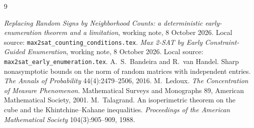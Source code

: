 \documentclass[11pt,a4paper]{article}
\theoremstyle{remark}
\begin{document}
\begin{thebibliography}{9}
\small\raggedright
{} \emph{Replacing Random Signs by Neighborhood Counts: a
 deterministic early-enumeration theorem and a limitation}, working note,
 8 October 2026. Local source: \texttt{max2sat\_counting\_conditions.tex}.
 \emph{Max 2-SAT by Early Constraint-Guided Enumeration}, working
 note, 8 October 2026. Local source: \texttt{max2sat\_early\_enumeration.tex}.
 A.~S.~Bandeira and R.~van Handel. Sharp nonasymptotic bounds on
 the norm of random matrices with independent entries. \emph{The Annals of
 Probability} 44(4):2479--2506, 2016.
 M.~Ledoux. \emph{The Concentration of Measure Phenomenon}.
 Mathematical Surveys and Monographs 89, American Mathematical Society, 2001.
 M.~Talagrand. An isoperimetric theorem on the cube and the
 Khintchine--Kahane inequalities. \emph{Proceedings of the American
 Mathematical Society} 104(3):905--909, 1988.
\end{thebibliography}
\end{document}
